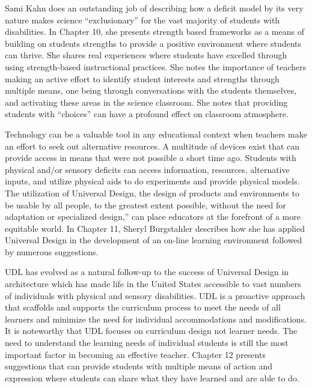 \documentclass[11.5pt]{sig-alternate} %
\begin{document}
\begin{large}
Sami Kahn does an outstanding job of describing how a deficit model by its very nature makes science “exclusionary” for the vast majority of students with disabilities.  In Chapter 10, she presents strength based frameworks as a means of building on students strengths to provide a positive environment where students can thrive. She shares real experiences where students have excelled through using strength-based instructional practices.  She notes the importance of teachers making an active effort to identify student interests and strengths through multiple means, one being through conversations with the students themselves, and activating these areas in the science classroom.  She notes that providing students with “choices” can have a profound effect on classroom atmosphere.

Technology can be a valuable tool in any educational context when teachers make an effort to seek out alternative resources.  A multitude of devices exist that can provide access in means that were not possible a short time ago. Students with physical and/or sensory deficits can access information, resources, alternative inputs, and utilize physical aids to do experiments and provide physical models.  The utilization of Universal Design, the design of products and environments to be usable by all people, to the greatest extent possible, without the need for adaptation or specialized design,” can place educators at the forefront of a more equitable world.   In Chapter 11, Sheryl Burgstahler describes how she has applied Universal Design in the development of an on-line learning environment followed by numerous suggestions.

UDL has evolved as a natural follow-up to the success of Universal Design in architecture which has made life in the United States accessible to vast numbers of individuals with physical and sensory disabilities.  UDL is a proactive approach that scaffolds and supports the curriculum process to meet the needs of all learners and minimize the need for individual accommodations and modifications.  It is noteworthy that UDL focuses on curriculum design not learner needs.  The need to understand the learning needs of individual students is still the most important factor in becoming an effective teacher.  Chapter 12 presents suggestions that can provide students with multiple means of action and expression where students can share what they have learned and are able to do.


\end{large}
\end{document}
